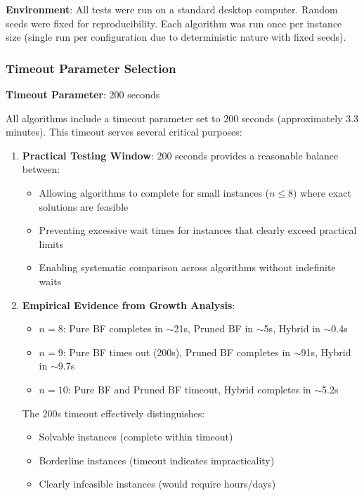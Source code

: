 \documentclass[12pt]{article}
\begin{document}
\textbf{Environment}: All tests were run on a standard desktop computer. Random seeds were fixed for reproducibility. Each algorithm was run once per instance size (single run per configuration due to deterministic nature with fixed seeds).

\subsubsection{Timeout Parameter Selection}

\textbf{Timeout Parameter}: 200 seconds

All algorithms include a timeout parameter set to 200 seconds (approximately 3.3 minutes). This timeout serves several critical purposes:

\begin{enumerate}
    \item \textbf{Practical Testing Window}: 200 seconds provides a reasonable balance between:
    \begin{itemize}
        \item Allowing algorithms to complete for small instances ($n \leq 8$) where exact solutions are feasible
        \item Preventing excessive wait times for instances that clearly exceed practical limits
        \item Enabling systematic comparison across algorithms without indefinite waits
    \end{itemize}
    
    \item \textbf{Empirical Evidence from Growth Analysis}:
    \begin{itemize}
        \item $n=8$: Pure BF completes in $\sim$21s, Pruned BF in $\sim$5s, Hybrid in $\sim$0.4s
        \item $n=9$: Pure BF times out (200s), Pruned BF completes in $\sim$91s, Hybrid in $\sim$9.7s
        \item $n=10$: Pure BF and Pruned BF timeout, Hybrid completes in $\sim$5.2s
    \end{itemize}
    The 200s timeout effectively distinguishes:
    \begin{itemize}
        \item Solvable instances (complete within timeout)
        \item Borderline instances (timeout indicates impracticality)
        \item Clearly infeasible instances (would require hours/days)
    \end{itemize}
    

\end{enumerate}
\end{document}
